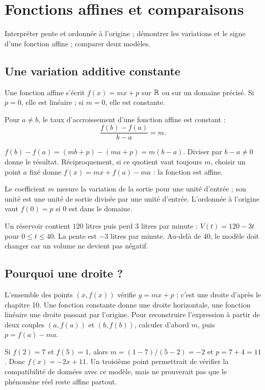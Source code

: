 \documentclass[../cours_2de.tex]{subfiles}
\begin{document}
\setcounter{chapter}{12}
\chapter{Fonctions affines et comparaisons}
\label{sec:ch13}
\begin{objectif}
Interpréter pente et ordonnée à l'origine ; démontrer les variations et le signe d'une fonction affine ; comparer deux modèles.
\end{objectif}
\section{Une variation additive constante}
Une fonction affine s'écrit $f(x)=mx+p$ sur $\mathbb{R}$ ou sur un domaine précisé. Si $p=0$, elle est linéaire ; si $m=0$, elle est constante.
\begin{propriete}
Pour $a\ne b$, le taux d'accroissement d'une fonction affine est constant :
\[
\frac{f(b)-f(a)}{b-a}=m.
\]
\end{propriete}
\begin{demonstration}
$f(b)-f(a)=(mb+p)-(ma+p)=m(b-a)$.
Diviser par $b-a\ne0$ donne le résultat. Réciproquement, si ce quotient vaut toujours $m$, choisir un point $a$ fixé donne $f(x)=mx+f(a)-ma$ : la fonction est affine.
\end{demonstration}
Le coefficient $m$ mesure la variation de la sortie pour une unité d'entrée ; son unité est une unité de sortie divisée par une unité d'entrée. L'ordonnée à l'origine vaut $f(0)=p$ si $0$ est dans le domaine.
\begin{exemple}
Un réservoir contient $120$ litres puis perd $3$ litres par minute :
$V(t)=120-3t$ pour $0\leq t\leq40$. La pente est $-3$ litres par minute. Au-delà de $40$, le modèle doit changer car un volume ne devient pas négatif.
\end{exemple}
\section{Pourquoi une droite ?}
L'ensemble des points $(x,f(x))$ vérifie $y=mx+p$ ; c'est une droite d'après le chapitre 10. Une fonction constante donne une droite horizontale, une fonction linéaire une droite passant par l'origine.
Pour reconstruire l'expression à partir de deux couples $(a,f(a))$ et $(b,f(b))$, calculer d'abord $m$, puis $p=f(a)-ma$.
\begin{exemple}
Si $f(2)=7$ et $f(5)=1$, alors $m=(1-7)/(5-2)=-2$ et $p=7+4=11$.
Donc $f(x)=-2x+11$. Un troisième point permettrait de vérifier la compatibilité de données avec ce modèle, mais ne prouverait pas que le phénomène réel reste affine partout.
\end{exemple}
\end{document}
